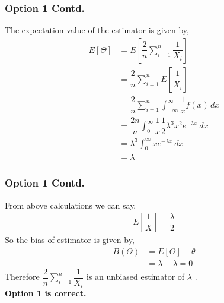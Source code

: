 \documentclass{beamer}
\begin{document}
\begin{frame}
\frametitle{Option 1 Contd.}
The expectation value of the estimator is given by, 
\begin{align}
    E[\Theta ] &= E  \left[   \dfrac{2}{n} \sum_{i=1}^{n} \dfrac{1}{X_i}  \right] \\
    & = \dfrac{2}{n} \sum_{i=1}^{n} E  \left[ \dfrac{1}{X_i}  \right] \\
    & =  \dfrac{2}{n} \sum_{i=1}^{n} \int_{-\infty}^{\infty} \dfrac{1}{x} f(x)\,dx \\
    \label{eq1}
    & = \dfrac{2n}{n} \int_{0}^{\infty} \dfrac{1}{x} \dfrac{1}{2} \lambda^3x^2e^{-\lambda x}\,dx \\
    & = \lambda^3  \int_{0}^{\infty}  x e^{-\lambda x}\,dx \\
    &= \lambda
\end{align}
\end{frame}

\begin{frame}
\frametitle{Option 1 Contd.}
From above calculations we can say,
\begin{align}
    E  \left[ \dfrac{1}{X}  \right] = \dfrac{\lambda}{2}
    \label{eq}
\end{align}
So the bias of estimator is given by,
\begin{align}
    B(\Theta) &= E[\Theta] - \theta  \\
    &= \lambda - \lambda = 0
\end{align}
Therefore $\dfrac{2}{n} \sum_{i=1}^{n} \dfrac{1}{X_i} $ is an unbiased estimator of $ \lambda$ .\\
\textbf{Option 1 is correct.} \\
\end{frame}
\end{document}
